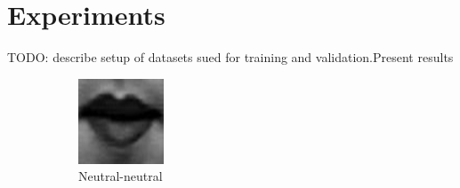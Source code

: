 \section{Experiments}
\nocite{Kanade2000CK+}\nocite{Lucey2010CK+}

TODO: describe setup of datasets sued for training and validation.Present results


\begin{figure}%
	\centering
	\begin{subfigure}[b]{0.15\textwidth}
		\includegraphics[width=\textwidth]{./img/timeseriesHappy/S026_006_00000001_conew1.png}
		\caption{Neutral-neutral}
		\label{fig:timeseriesHappy:a}
	\end{subfigure}
	\begin{subfigure}[b]{0.15\textwidth}

\end{subfigure}
\end{figure}
